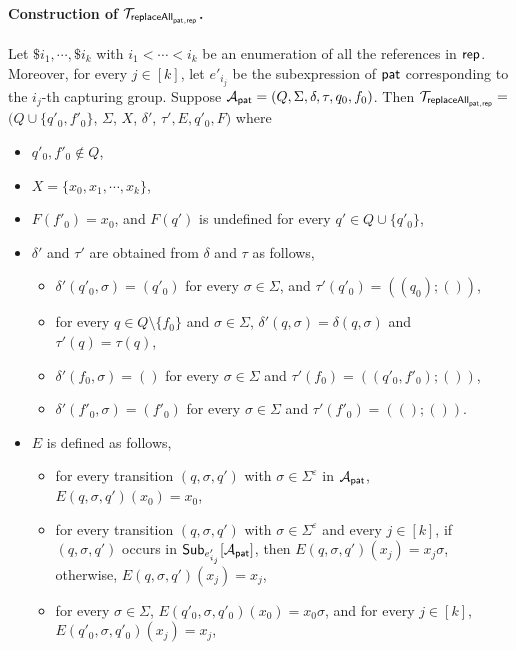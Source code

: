 \paragraph*{Construction of $\mathcal{T}_{\mathsf{replaceAll}_{\mathsf{pat}, \mathsf{rep}}}$.} 
Let $\$i_1, \cdots, \$i_k$ with $i_1 < \cdots < i_k$ be an enumeration of all the references in $\mathsf{rep}$. 
Moreover, for every $j \in [k]$, let $e'_{i_j}$ be the subexpression of $\mathsf{pat}$ corresponding to the $i_j$-th capturing group.
Suppose $\mathcal{A}_{\mathsf{pat}} = (Q, \Sigma, \delta, \tau, q_0, f_0)$. Then $\mathcal{T}_{\mathsf{replaceAll}_{\mathsf{pat}, \mathsf{rep}}} =$ $(Q \cup \{q'_0, f'_0\}$, $\Sigma$, $X$, $\delta'$, $\tau', E, q'_0, F)$ where
\begin{itemize}
\item $q'_0, f'_0 \not \in Q$,

\item  $X = \{x_0, x_1, \cdots, x_k\}$,
%
\item $F(f'_0) = x_0$, and $F(q')$ is undefined for every $q' \in Q \cup \{q'_0\}$,
%
\item $\delta'$ and $\tau'$ are obtained from $\delta$ and $\tau$ as follows,
\begin{itemize}
\item $\delta'(q'_0, \sigma) = (q'_0)$ for every $\sigma \in \Sigma$, and $\tau'(q'_0) = ((q_0); ())$,
%
\item  for every $q \in Q \setminus \{f_0\}$ and $\sigma \in \Sigma$, $\delta'(q, \sigma) = \delta(q, \sigma)$ and $\tau'(q) = \tau(q)$, 
%
\item $\delta'(f_0, \sigma) = ()$ for every $\sigma \in \Sigma$ and $\tau'(f_0) = ((q'_0,f'_0); ())$,
%
\item $\delta'(f'_0, \sigma) = (f'_0)$ for every $\sigma \in \Sigma$ and $\tau'(f'_0) = ((); ())$.
\end{itemize}
%
\item $E$ is defined as follows, 
\begin{itemize}
\item for every transition $(q, \sigma, q')$ with $\sigma \in \Sigma^\varepsilon$ in $\mathcal{A}_{\mathsf{pat}}$, $E(q, \sigma, q')(x_0) = x_0$,
%
\item for every transition $(q, \sigma, q')$ with $\sigma \in \Sigma^\varepsilon$ and every $j \in [k]$,  if $(q, \sigma, q')$ occurs in ${\sf Sub}_{e'_{i_j}}[\mathcal{A}_{\mathsf{pat}}]$, then $E(q, \sigma, q')(x_j) = x_j\sigma$, otherwise, $E(q, \sigma, q')(x_j) = x_j$,
%
%
\item  for every $\sigma \in \Sigma$, $E(q'_0, \sigma, q'_0)(x_0) = x_0\sigma$, and for every $j \in [k]$, $E(q'_0, \sigma, q'_0)(x_j) = x_j$, 


\end{itemize}
\end{itemize}
